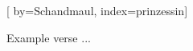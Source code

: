 
[%
    by={Schandmaul},
    index={prinzessin}]


    \label{prinzessin}

    \beginverse
        Example verse ...
    \endverse
\endsong
